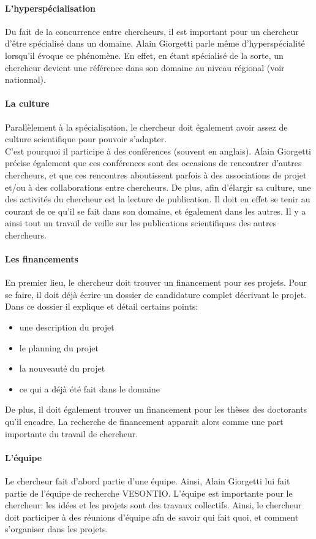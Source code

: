 \documentclass[a4paper,12pt, draft]{report}
\begin{document}
\paragraph{L'hyperspécialisation}
Du fait de la concurrence entre chercheurs, il est important pour un chercheur d'être spécialisé dans un domaine. Alain Giorgetti parle même d'hyperspécialité lorsqu'il évoque ce phénomène. En effet, en étant spécialisé de la sorte, un chercheur devient une référence dans son domaine au niveau régional (voir nationnal).

\paragraph{La culture}
Parallèlement à la spécialisation, le chercheur doit également avoir assez de culture scientifique pour pouvoir s'adapter. 
\\C'est pourquoi il participe à des conférences (souvent en anglais). Alain Giorgetti précise également que ces conférences sont des occasions de rencontrer d'autres chercheurs, et que ces rencontres aboutissent parfois à des associations de projet et/ou à des collaborations entre chercheurs.
De plus, afin d'élargir sa culture, une des activités du chercheur est la lecture de publication. Il doit en effet se tenir au courant de ce qu'il se fait dans son domaine, et également dans les autres. Il y a ainsi tout un travail de veille sur les publications scientifiques des autres chercheurs.


\paragraph{Les financements}
En premier lieu, le chercheur doit trouver un financement pour ses projets. Pour se faire, il doit déjà écrire un dossier de candidature complet décrivant le projet. Dans ce dossier il explique et détail certains points:
\begin{itemize}
\item une description du projet
\item le planning du projet
\item la nouveauté du projet
\item ce qui a déjà été fait dans le domaine
\end{itemize}
De plus, il doit également trouver un financement pour les thèses des doctorants qu'il encadre.
La recherche de financement apparait alors comme une part importante du travail de chercheur.


\paragraph{L'équipe}
Le chercheur fait d'abord partie d'une équipe. Ainsi, Alain Giorgetti lui fait partie de l'équipe de recherche VESONTIO. L'équipe est importante pour le chercheur: les idées et les projets sont des travaux collectifs. Ainsi, le chercheur doit participer à des réunions d'équipe afn de savoir qui fait quoi, et comment s'organiser dans les projets.
\end{document}

